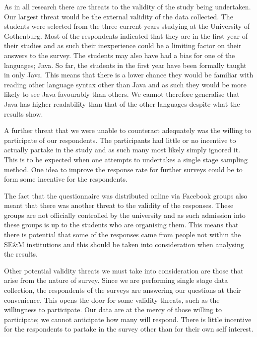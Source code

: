 \documentclass[times, 10pt,twocolumn]{Article}
\begin{document}
As in all research there are threats to the validity of the study being undertaken. Our largest threat would be the external validity of the data collected. The students were selected from the three current years studying at the University of Gothenburg. Most of the respondents indicated that they are in the first year of their studies and as such their inexperience could be a limiting factor on their answers to the survey. The students may also have had a bias for one of the languages; Java. So far, the students in the first year have been formally taught in only Java. This means that there is a lower chance they would be familiar with reading other language syntax other than Java and as such they would be more likely to see Java favourably than others. We cannot therefore generalise that Java has higher readability than that of the other languages despite what the results show. 

A further threat that we were unable to counteract adequately was the willing to participate of our respondents. The participants had little or no incentive to actually partake in the study and as such many most likely simply ignored it. This is to be expected when one attempts to undertakes a single stage sampling method. One idea to improve the response rate for further surveys could be to form some incentive for the respondents.

The fact that the questionnaire was distributed online via Facebook groups also meant that there was another threat to the validity of the responses. These groups are not officially controlled by the university and as such admission into these groups is up to the students who are organising them. This means that there is potential that some of the responses came from people not within the SE\&M institutions and this should be taken into consideration when analysing the results.

Other potential validity threats we must take into consideration are those that arise from the nature of survey. Since we are performing single stage data collection, the respondents of the surveys are answering our questions at their convenience. This opens the door for some validity threats, such as the willingness to participate. Our data are at the mercy of those willing to participate; we cannot anticipate how many will respond. There is little incentive for the respondents to partake in the survey other than for their own self interest.




\end{document}
